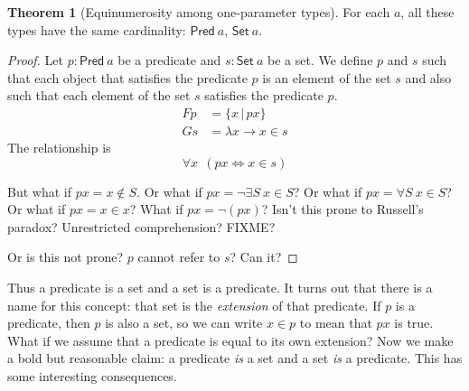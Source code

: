\documentclass[10pt,statementpaper]{memoir}
\theoremstyle{definition}
\newcounter{thmctr}
\newtheorem{mthm}[thmctr]{Theorem}
\newcommand\Fa[1]{\forall#1~}
\newcommand\FA[1]{\forall#1~~}
\newcommand\sfSet{\mathsf{Set}}
\newcommand\Set[1]{\sfSet~#1}
\newcommand\sfPred{\mathsf{Pred}}
\newcommand\Pred[1]{\sfPred~#1}
\begin{document}
\begin{mthm}[Equinumerosity among one-parameter types]
    For each $a$, all these types have the same cardinality:
    $\Pred{a}$, $\Set{a}$.
    \begin{proof}
        Let $p : \Pred{a}$ be a predicate and $s : \Set{a}$ be a set.
        We define $p$ and $s$ such that each object that satisfies the predicate $p$ is an element of the set $s$
        and also such that each element of the set $s$ satisfies the predicate $p$.
        \begin{align*}
            F p &= \{ x \,|\, p x \}
            \\
            G s &= \lambda x \to x \in s
        \end{align*}
        The relationship is
        \[ \FA{x} (p x \iff x \in s) \]

        But what if $p x = x \not\in S$.
        Or what if $p x = \neg\exists S ~ x \in S$?
        Or what if $p x = \Fa{S} x \in S$?
        Or what if $p x = x \in x$?
        What if $p x = \neg (p x)$?
        Isn't this prone to Russell's paradox?
        Unrestricted comprehension?
        FIXME?

        Or is this not prone?
        $p$ cannot refer to $s$?
        Can it?
    \end{proof}
\end{mthm}

Thus a predicate is a set and a set is a predicate.
It turns out that there is a name for this concept:
that set is the \emph{extension} of that predicate.
If $p$ is a predicate, then $p$ is also a set,
so we can write $x \in p$ to mean that $p x$ is true.
What if we assume that a predicate is equal to its own extension?
Now we make a bold but reasonable claim:
a predicate \emph{is} a set and a set \emph{is} a predicate.
This has some interesting consequences.
\end{document}
